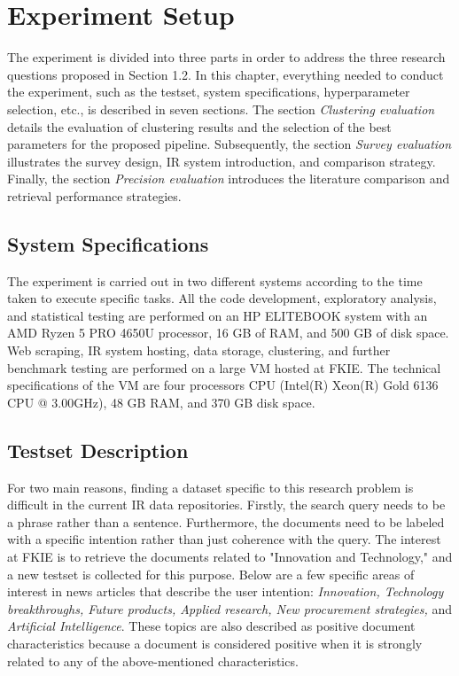 
\chapter{Experiment Setup}

The experiment is divided into three parts in order to address the three research questions proposed in Section 1.2. In this chapter, everything needed to conduct the experiment, such as the testset, system specifications, hyperparameter selection, etc., is described in seven sections. The section \textit{Clustering evaluation} details the evaluation of clustering results and the selection of the best parameters for the proposed pipeline. Subsequently, the section \textit{Survey evaluation} illustrates the survey design, \ac{IR} system introduction, and comparison strategy. Finally, the section \textit{Precision evaluation} introduces the literature comparison and retrieval performance strategies.



	\section{System Specifications}

The experiment is carried out in two different systems according to the time taken to execute specific tasks. All the code development, exploratory analysis, and statistical testing are performed on an HP ELITEBOOK system with an AMD Ryzen 5 PRO 4650U processor, 16 GB of RAM, and 500 GB of disk space. Web scraping, \ac{IR} system hosting, data storage, clustering, and further benchmark testing are performed on a large \ac{VM} hosted at \ac{FKIE}. The technical specifications of the \ac{VM} are four processors CPU (Intel(R) Xeon(R) Gold 6136 CPU @ 3.00GHz), 48 GB RAM, and 370 GB disk space.
	
	
	\section{Testset Description}

For two main reasons, finding a dataset specific to this research problem is difficult in the current \ac{IR} data repositories. Firstly, the search query needs to be a phrase rather than a sentence. Furthermore, the documents need to be labeled with a specific intention rather than just coherence with the query. The interest at \ac{FKIE} is to retrieve the documents related to "Innovation and Technology," and a new testset is collected for this purpose. Below are a few specific areas of interest in news articles that describe the user intention: \emph{Innovation, Technology breakthroughs, Future products, Applied research, New procurement strategies,} and \textit{Artificial Intelligence}. These topics are also described as positive document characteristics because a document is considered positive when it is strongly related to any of the above-mentioned characteristics.


